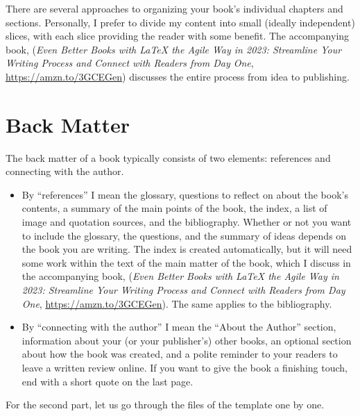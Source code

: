 There are several approaches to organizing your book's individual chapters and sections. Personally, I prefer to divide my content into small (ideally independent) slices, with each slice providing the reader with some benefit. The accompanying book, (\textit{Even Better Books with LaTeX the Agile Way in 2023: Streamline Your Writing Process and Connect with Readers from Day One}, \url{https://amzn.to/3GCEGen}) discusses the entire process from idea to publishing.


\section{Back Matter}\label{backmatter:sec}

The back matter of a book typically consists of two elements: references and connecting with the author.

\begin{itemize}
    \item  By ``references'' I mean the glossary, questions to reflect on about the book's contents, a summary of the main points of the book, the index, a list of image and quotation sources, and the bibliography. Whether or not you want to include the glossary, the questions, and the summary of ideas depends on the book you are writing. The index is created automatically, but it will need some work within the text of the main matter of the book, which I discuss in the accompanying book, (\textit{Even Better Books with LaTeX the Agile Way in 2023: Streamline Your Writing Process and Connect with Readers from Day One}, \url{https://amzn.to/3GCEGen}). The same applies to the bibliography.
    
    \item By ``connecting with the author'' I mean the ``About the Author'' section, information about your (or your publisher's) other books, an optional section about how the book was created, and a polite reminder to your readers to leave a written review online. If you want to give the book a finishing touch, end with a short quote on the last page. 
\end{itemize}

For the second part, let us go through the files of the template one by one.

